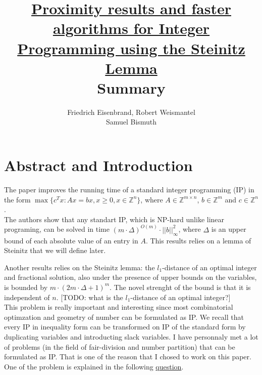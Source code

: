 \documentclass[12pt]{article}
\title{\href{https://arxiv.org/abs/1707.00481}{Proximity results and faster algorithms for Integer Programming using the Steinitz Lemma} \\
Summary}
\author{Friedrich Eisenbrand, Robert Weismantel \\
Samuel Bismuth}
\theoremstyle{definition}
\begin{document}
\maketitle




\section{Abstract and Introduction}

The paper improves the running time of a standard integer programming (IP) in the form
$\max \{c^T x : A x = b x, x \geq 0, x \in \mathbb{Z}^n \}$, where $A \in \mathbb{Z}^{m \times n}$, $b \in \mathbb{Z}^m$ and $c \in \mathbb{Z}^n$. \\
The authors show that any standart IP, which is NP-hard unlike linear programing, can be solved in time $(m \cdot \Delta)^{O(m)} \cdot ||b||^2_\infty$, where $\Delta$ is an upper bound of each absolute value of an entry in $A$. This results relies on a lemma of Steinitz that we will define later. 

Another results relies on the Steinitz lemma: the $l_1$-distance of an optimal integer and fractional solution, also under the presence of upper bounds on the variables, is bounded by $m \cdot (2m \cdot \Delta + 1)^m$. The novel strenght of the bound is that it is independent of $n$.
[TODO: what is the $l_1$-distance of an optimal integer?] \\

This problem is really important and interesting since most combinatorial optimzation and geometry of number can be formulated as IP. We recall that every IP in inequality form can be transformed on IP of the standard form by duplicating variables and introducting slack variables. I have personnaly met a lot of problems (in the field of fair-division and number partition) that can be formulated as IP. That is one of the reason that I chosed to work on this paper. One of the problem is explained in the following \href{https://or.stackexchange.com/questions/7062/}{question}. \\
\end{document}
